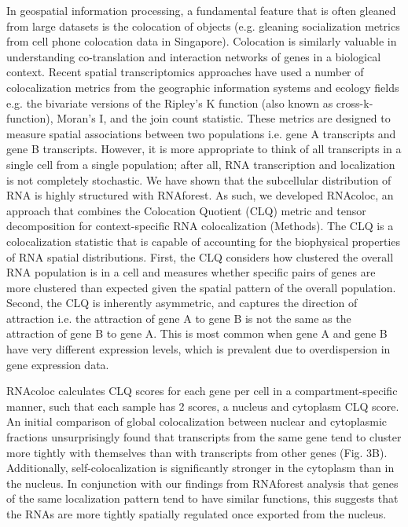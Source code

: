 In geospatial information processing, a fundamental feature that is often gleaned from large datasets is the colocation of objects (e.g. gleaning socialization metrics from cell phone colocation data in Singapore\cite{xuHowFriendsShare2017}). Colocation is similarly valuable in understanding co-translation and interaction networks of genes in a biological context\cite{zengSpatiallyResolvedSinglecell2023}. Recent spatial transcriptomics approaches have used a number of colocalization metrics from the geographic information systems and ecology fields e.g. the bivariate versions of the Ripley's K function (also known as cross-k-function)\cite{ripleySecondorderAnalysisStationary1976}, Moran's I\cite{tiefelsdorfModellingSpatialProcesses2006}, and the join count statistic\cite{cliffSpatialProcessesModels1981}. These metrics are designed to measure spatial associations between two populations i.e. gene A transcripts and gene B transcripts. However, it is more appropriate to think of all transcripts in a single cell from a single population; after all, RNA transcription and localization is not completely stochastic. We have shown that the subcellular distribution of RNA is highly structured with RNAforest. As such, we developed RNAcoloc, an approach that combines  the Colocation Quotient (CLQ)\cite{leslieColocationQuotientNew2011} metric and tensor decomposition for context-specific RNA colocalization (Methods). The CLQ is a colocalization statistic that is capable of accounting for the biophysical properties of RNA spatial distributions. First, the CLQ considers how clustered the overall RNA population is in a cell and measures whether specific pairs of genes are more clustered than expected given the spatial pattern of the overall population. Second, the CLQ is inherently asymmetric, and captures the direction of attraction i.e. the attraction of gene A to gene B is not the same as the attraction of gene B to gene A. This is most common when gene A and gene B have very different expression levels, which is prevalent due to overdispersion in gene expression data.

RNAcoloc calculates CLQ scores for each gene per cell in a compartment-specific manner, such that each sample has 2 scores, a nucleus and cytoplasm CLQ score. An initial comparison of global colocalization between nuclear and cytoplasmic fractions unsurprisingly found that transcripts from the same gene tend to cluster more tightly with themselves than with transcripts from other genes (Fig. 3B). Additionally, self-colocalization is significantly stronger in the cytoplasm than in the nucleus. In conjunction with our findings from RNAforest analysis that genes of the same localization pattern tend to have similar functions, this suggests that the RNAs are more tightly spatially regulated once exported from the nucleus. 

